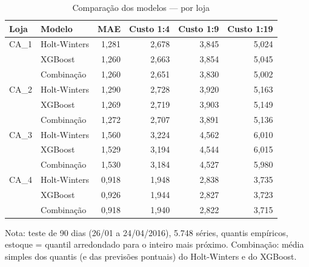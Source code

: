 \begin{table}[htbp]
\centering
\small
\caption{Comparação dos modelos — por loja}
\label{tab:comp_por_loja}
\begin{tabular}{llrrrr}
\toprule
Loja & Modelo & MAE & Custo 1:4 & Custo 1:9 & Custo 1:19 \\
\midrule
CA\_1 & Holt-Winters & 1,281 & 2,678 & 3,845 & 5,024 \\
 & XGBoost & 1,260 & 2,663 & 3,854 & 5,045 \\
 & Combinação & 1,260 & 2,651 & 3,830 & 5,002 \\
\addlinespace
CA\_2 & Holt-Winters & 1,290 & 2,728 & 3,920 & 5,163 \\
 & XGBoost & 1,269 & 2,719 & 3,903 & 5,149 \\
 & Combinação & 1,272 & 2,707 & 3,891 & 5,136 \\
\addlinespace
CA\_3 & Holt-Winters & 1,560 & 3,224 & 4,562 & 6,010 \\
 & XGBoost & 1,529 & 3,194 & 4,544 & 6,015 \\
 & Combinação & 1,530 & 3,184 & 4,527 & 5,980 \\
\addlinespace
CA\_4 & Holt-Winters & 0,918 & 1,948 & 2,838 & 3,735 \\
 & XGBoost & 0,926 & 1,944 & 2,827 & 3,723 \\
 & Combinação & 0,918 & 1,940 & 2,822 & 3,715 \\
\bottomrule
\end{tabular}
\par\smallskip
{\footnotesize Nota: teste de 90 dias (26/01 a 24/04/2016), 5.748 séries, quantis empíricos, estoque = quantil arredondado para o inteiro mais próximo. Combinação: média simples dos quantis (e das previsões pontuais) do Holt-Winters e do XGBoost.}
\end{table}
